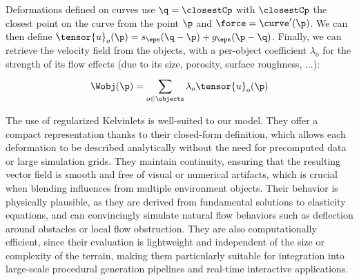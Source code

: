 Deformations defined on curves use $\q = \closestCp$ with $\closestCp$ the closest point on the curve from the point $\p$ and $\force = \curve'(\p)$. We can then define $\tensor{u}_o(\p) = s_\eps(\q - \p) + g_\eps(\p - \q)$.
Finally, we can retrieve the velocity field from the objects, with a per-object coefficient $\lambda_o$ for the strength of its flow effects (due to its size, porosity, surface roughness, ...):
\begin{align}
    \Wobj(\p) = \sum_{o \in \objects}^{}{\lambda_o \tensor{u}_o(\p)}
\end{align}

The use of regularized Kelvinlets is well-suited to our model. They offer a compact representation thanks to their closed-form definition, which allows each deformation to be described analytically without the need for precomputed data or large simulation grids. They maintain continuity, ensuring that the resulting vector field is smooth and free of visual or numerical artifacts, which is crucial when blending influences from multiple environment objects. Their behavior is physically plausible, as they are derived from fundamental solutions to elasticity equations, and can convincingly simulate natural flow behaviors such as deflection around obstacles or local flow obstruction. They are also computationally efficient, since their evaluation is lightweight and independent of the size or complexity of the terrain, making them particularly suitable for integration into large-scale procedural generation pipelines and real-time interactive applications.



